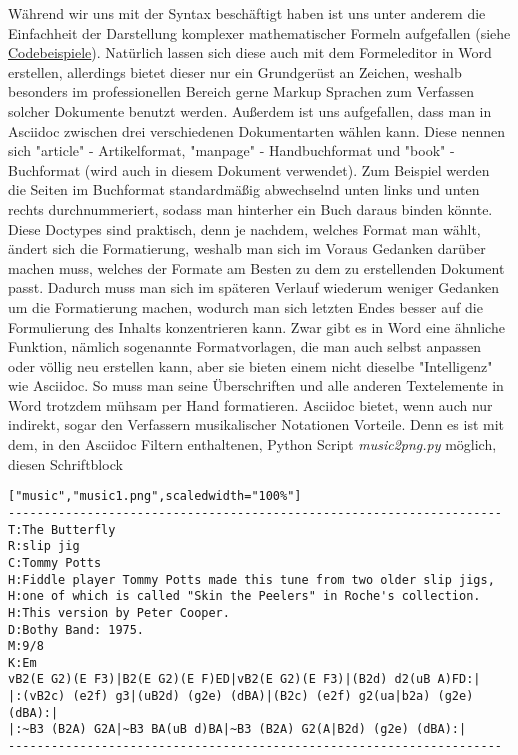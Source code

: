 \documentclass[11pt]{amsbook}
\begin{document}
Während wir uns mit der Syntax beschäftigt haben ist uns unter anderem die Einfachheit der Darstellung komplexer mathematischer Formeln aufgefallen (siehe \hyperlink{x-codebeispiele}{Codebeispiele}). Natürlich lassen sich diese auch mit dem Formeleditor in Word erstellen, allerdings bietet dieser nur ein Grundgerüst an Zeichen, weshalb besonders im professionellen Bereich gerne Markup Sprachen zum Verfassen solcher Dokumente benutzt werden.
Außerdem ist uns aufgefallen, dass man in Asciidoc zwischen drei verschiedenen Dokumentarten wählen kann. Diese nennen sich "article" - Artikelformat, "manpage" - Handbuchformat und "book" - Buchformat (wird auch in diesem Dokument verwendet). Zum Beispiel werden die Seiten im Buchformat standardmäßig abwechselnd unten links und unten rechts durchnummeriert, sodass man hinterher ein Buch daraus binden könnte. Diese Doctypes sind praktisch, denn je nachdem, welches Format man wählt, ändert sich die Formatierung, weshalb man sich im Voraus Gedanken darüber machen muss, welches der Formate am Besten zu dem zu erstellenden Dokument passt. Dadurch muss man sich im späteren Verlauf wiederum weniger Gedanken um die Formatierung machen, wodurch man sich letzten Endes besser auf die Formulierung des Inhalts konzentrieren kann. Zwar gibt es in Word eine ähnliche Funktion, nämlich sogenannte Formatvorlagen, die man auch selbst anpassen oder völlig neu erstellen kann, aber sie bieten einem nicht dieselbe "Intelligenz" wie Asciidoc. So muss man seine Überschriften und alle anderen Textelemente in Word trotzdem mühsam per Hand formatieren.
Asciidoc bietet, wenn auch nur indirekt, sogar den Verfassern musikalischer Notationen Vorteile. Denn es ist mit dem, in den Asciidoc Filtern enthaltenen, Python Script \emph{music2png.py} möglich, diesen Schriftblock


\begin{verbatim}
["music","music1.png",scaledwidth="100%"]
---------------------------------------------------------------------
T:The Butterfly
R:slip jig
C:Tommy Potts
H:Fiddle player Tommy Potts made this tune from two older slip jigs,
H:one of which is called "Skin the Peelers" in Roche's collection.
H:This version by Peter Cooper.
D:Bothy Band: 1975.
M:9/8
K:Em
vB2(E G2)(E F3)|B2(E G2)(E F)ED|vB2(E G2)(E F3)|(B2d) d2(uB A)FD:|
|:(vB2c) (e2f) g3|(uB2d) (g2e) (dBA)|(B2c) (e2f) g2(ua|b2a) (g2e) (dBA):|
|:~B3 (B2A) G2A|~B3 BA(uB d)BA|~B3 (B2A) G2(A|B2d) (g2e) (dBA):|
---------------------------------------------------------------------
\end{verbatim}
\end{document}
